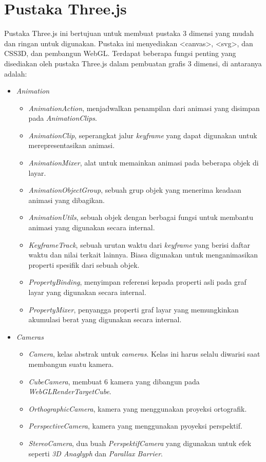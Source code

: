 \section{Pustaka Three.js}
\label{sec:latex}
Pustaka Three.js ini bertujuan untuk membuat pustaka 3 dimensi yang mudah dan ringan untuk digunakan. Pustaka ini menyediakan <canvas>, <svg>, dan CSS3D, dan pembangun WebGL.
Terdapat beberapa fungsi penting yang disediakan oleh pustaka Three.js dalam pembuatan grafis 3 dimensi, di antaranya adalah:
\begin{itemize}

\item \textit{Animation}

	\begin{itemize}
	\item {\it AnimationAction}, menjadwalkan penampilan dari animasi yang disimpan pada {\it AnimationClips}.
	\item {\it AnimationClip}, seperangkat jalur {\it keyframe} yang dapat digunakan untuk merepresentasikan animasi.
	\item {\it AnimationMixer}, alat untuk memainkan animasi pada beberapa objek di layar.
	\item {\it AnimationObjectGroup}, sebuah grup objek yang menerima keadaan animasi yang dibagikan.
	\item {\it AnimationUtils}, sebuah objek dengan berbagai fungsi untuk membantu animasi yang digunakan secara internal.
	\item {\it KeyframeTrack}, sebuah urutan waktu dari {\it keyframe} yang berisi daftar waktu dan nilai terkait lainnya. Biasa digunakan untuk menganimasikan properti spesifik dari sebuah objek.
	\item {\it PropertyBinding}, menyimpan referensi kepada properti asli pada graf layar yang digunakan secara internal.
	\item {\it PropertyMixer}, penyangga properti graf layar yang memungkinkan akumulasi berat yang digunakan secara internal.
	\end{itemize}

\item \textit{Cameras}

	\begin{itemize}
	\item {\it Camera}, kelas abstrak untuk {\it cameras}. Kelas ini harus selalu diwarisi saat membangun suatu kamera.
	\item {\it CubeCamera}, membuat 6 kamera yang dibangun pada {\it WebGLRenderTargetCube}.
	\item{\it OrthographicCamera}, kamera yang menggunakan proyeksi ortografik.
	\item {\it PerspectiveCamera}, kamera yang menggunakan pyoyeksi perspektif.
	\item {\it StereoCamera}, dua buah {\it PerspektifCamera} yang digunakan untuk efek seperti {\it 3D Anaglyph} dan {\it Parallax Barrier}.
	\end{itemize}
	

\end{itemize}
